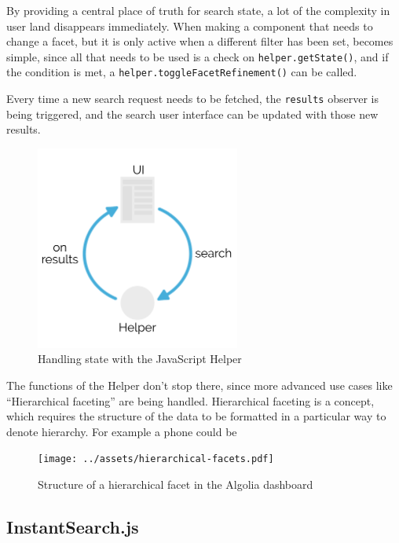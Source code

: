 By providing a central place of truth for search state, a lot of the complexity in user land disappears immediately. When making a component that needs to change a facet, but it is only active when a different filter has been set, becomes simple, since all that needs to be used is a check on {\tt helper.getState()}, and if the condition is met, a {\tt helper.toggleFacetRefinement()} can be called.

Every time a new search request needs to be fetched, the {\tt results} observer is being triggered, and the search user interface can be updated with those new results.

\begin{figure}[H]
\label{figure:js-helper-state}
  \centering
  \includegraphics[width=0.6\textwidth]{../assets/helper-cycle.pdf}
  \caption{Handling state with the JavaScript Helper\cite{js-helper-concepts}}
\end{figure}

The functions of the Helper don't stop there, since more advanced use cases like ``Hierarchical faceting''\cite{hierarchical-faceting} are being handled. Hierarchical faceting is a concept, which requires the structure of the data to be formatted in a particular way to denote hierarchy. For example a phone could be %

\begin{figure}[H]
\label{figure:hierarchical-facets}
  \centering
  \texttt{[image: ../assets/hierarchical-facets.pdf]}
  \caption{Structure of a hierarchical facet in the Algolia dashboard}
\end{figure}


\subsection{InstantSearch.js} %
\label{sub:instantsearch_js}


